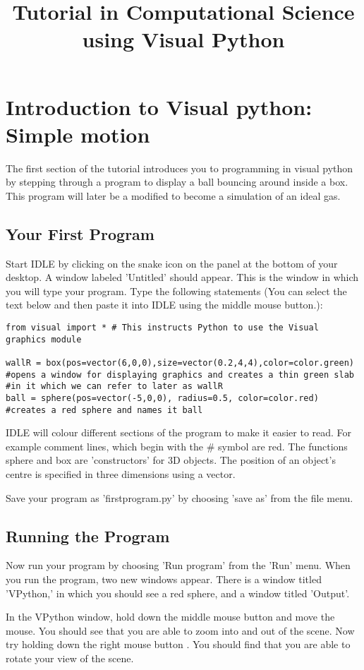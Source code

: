 \documentclass[a4paper]{letter}
\title{Tutorial in Computational Science using Visual Python}
\begin{document}



\section{Introduction to Visual python: Simple motion}
The first section of the tutorial introduces you to programming in visual python by stepping 
through a program to display a ball bouncing around inside a box.  
This program will later be a modified to become a simulation of an ideal gas.
\subsection{Your First Program}
Start IDLE by clicking on the snake icon on the panel at the bottom of your desktop. 
A window labeled 'Untitled' should appear. 
This is the window in which you will type your program.
Type the following statements 
(You can select the text below and then paste it into IDLE using the middle mouse button.):
{\color{code}
\begin{verbatim}
from visual import * # This instructs Python to use the Visual graphics module
 
wallR = box(pos=vector(6,0,0),size=vector(0.2,4,4),color=color.green) 
#opens a window for displaying graphics and creates a thin green slab  
#in it which we can refer to later as wallR
ball = sphere(pos=vector(-5,0,0), radius=0.5, color=color.red)
#creates a red sphere and names it ball
\end{verbatim}}
IDLE will colour different sections of the program to make it easier to read.
For example comment lines, which begin with the \# symbol are red.
The functions {\color{code}sphere} and {\color{code}box} are 'constructors' for 3D objects. 
The position of an object's centre is specified in three dimensions 
using a vector.

Save your program as 'firstprogram.py' by choosing 'save as' from the file menu.

\subsection{Running the Program}
Now run your program by choosing 'Run program' from the 'Run' menu. 
When you run the program, two new windows appear. 
There is a window titled 'VPython,' in which you should see a red sphere, 
and a window titled 'Output'. 

In the VPython window, hold down the middle mouse button and move the mouse. 
You should see that you are able to zoom into and out of the scene. 
Now try holding down the right mouse button . 
You should find that you are able to rotate your view of the scene.   
\end{document}
